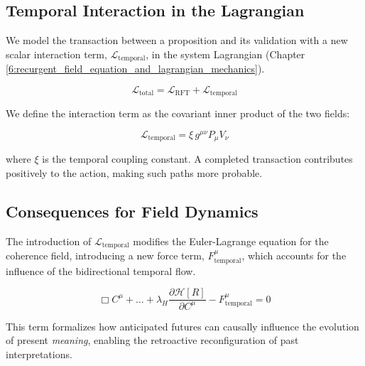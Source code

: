 \subsection{Temporal Interaction in the Lagrangian}
\label{9.6.3:temporal_interaction_in_the_lagrangian}

We model the transaction between a proposition and its validation with a new scalar interaction term, \(\mathcal{L}_{\text{temporal}}\), in the system Lagrangian (Chapter \ref{6:recurgent_field_equation_and_lagrangian_mechanics}).

\begin{equation}
\mathcal{L}_{\text{total}} = \mathcal{L}_{\text{RFT}} + \mathcal{L}_{\text{temporal}}
\end{equation}

We define the interaction term as the covariant inner product of the two fields:

\begin{equation}
\mathcal{L}_{\text{temporal}} = \xi \, g^{\mu\nu} P_{\mu} V_{\nu}
\end{equation}

where \(\xi\) is the temporal coupling constant. A completed transaction contributes positively to the action, making such paths more probable.


\subsection{Consequences for Field Dynamics}
\label{9.6.4:consequences_for_field_dynamics}

The introduction of \(\mathcal{L}_{\text{temporal}}\) modifies the Euler-Lagrange equation for the coherence field, introducing a new force term, \(F^\mu_{\text{temporal}}\), which accounts for the influence of the bidirectional temporal flow.

\begin{equation}
\Box C^\mu + \dots + \lambda_H \frac{\partial \mathcal{H}[R]}{\partial C^\mu} - F^\mu_{\text{temporal}} = 0
\end{equation}

This term formalizes how anticipated futures can causally influence the evolution of present \textit{meaning}, enabling the retroactive reconfiguration of past interpretations.